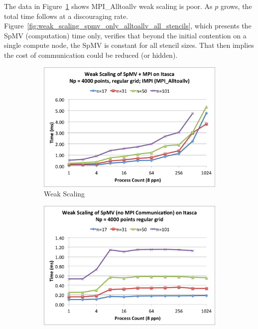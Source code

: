\documentclass{report}
\begin{document}
The data in Figure~\ref{fig:weak_scaling_alltoallv_all_stencils} shows MPI\_Alltoallv weak scaling is poor. As $p$ grows, the total time follows at a discouraging rate. Figure~\ref{fig:weak_scaling_spmv_only_alltoallv_all_stencils}, which presents the SpMV (computation) time only, verifies that beyond the initial contention on a single compute node, the SpMV is constant for all stencil sizes. That then implies the cost of communication could be reduced (or hidden). 

\begin{figure}
\centering
\begin{subfigure}{0.48\textwidth}
\centering
\includegraphics[width=\textwidth]{performance_content/scaling/weak_scaling_np4000_regular_alltoallv.png}
\caption{Weak Scaling}
\label{fig:weak_scaling_alltoallv_all_stencils}
\end{subfigure}
\begin{subfigure}{0.48\textwidth}
\centering
\includegraphics[width=\textwidth]{performance_content/scaling/weak_scaling_np4000_regular_spmvOnly.png}

\end{subfigure}
\end{figure}
\end{document}
